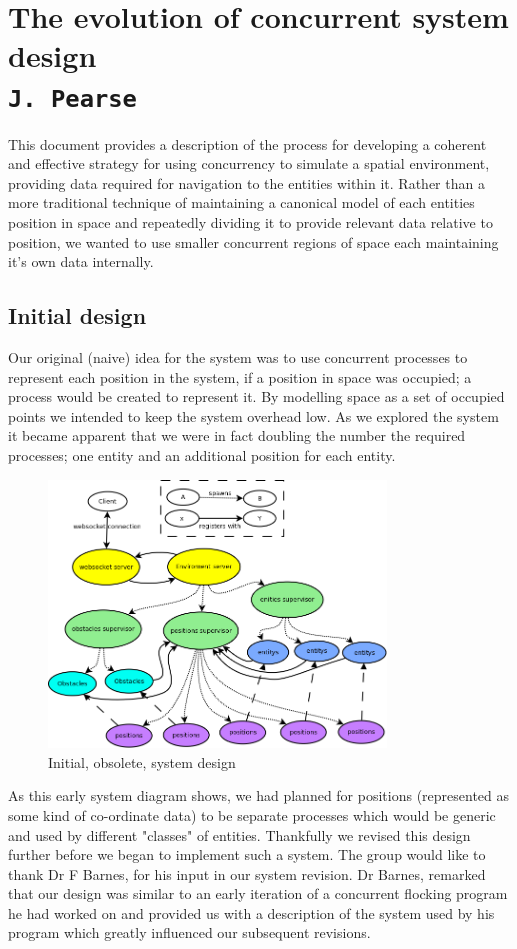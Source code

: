 \pagestyle{empty}

\section{The evolution of concurrent system design\\{\small\tt{J.~Pearse}}}
\label{system-design-document}
\label{system_evolution}
This document provides a description of the process for developing a coherent and effective strategy for using concurrency to simulate a spatial environment, providing data required for navigation to the entities within it.
Rather than a more traditional technique of maintaining a canonical model of each entities position in space and repeatedly dividing it to provide relevant data relative to position, we wanted to use smaller concurrent regions of space each maintaining it's own data internally.
\subsection{Initial design}
Our original (naive) idea for the system was to use concurrent processes to represent each position in the system, if a position in space was occupied; a process would be created to represent it. By modelling space as a set of occupied points we intended to keep the system overhead low. As we explored the system it became apparent that we were in fact doubling the number the required processes; one entity and an additional position for each entity.
\begin{figure}[h]
  \centering
  \includegraphics[width=0.8\textwidth]{img/HighLevelProcess.png}
\caption{Initial, obsolete, system design}
    \label{fig:Initial system design}
\end{figure}
As this early system diagram shows, we had planned for positions (represented as some kind of co-ordinate data) to be separate processes which would be generic and used by different "classes" of entities. Thankfully we revised this design further before we began to implement such a system.
The group would like to thank Dr F Barnes, for his input in our system revision. Dr Barnes, remarked that our design was similar to an early iteration of a concurrent flocking program he had worked on and provided us with a description of the system used by his program which greatly influenced our subsequent revisions.

